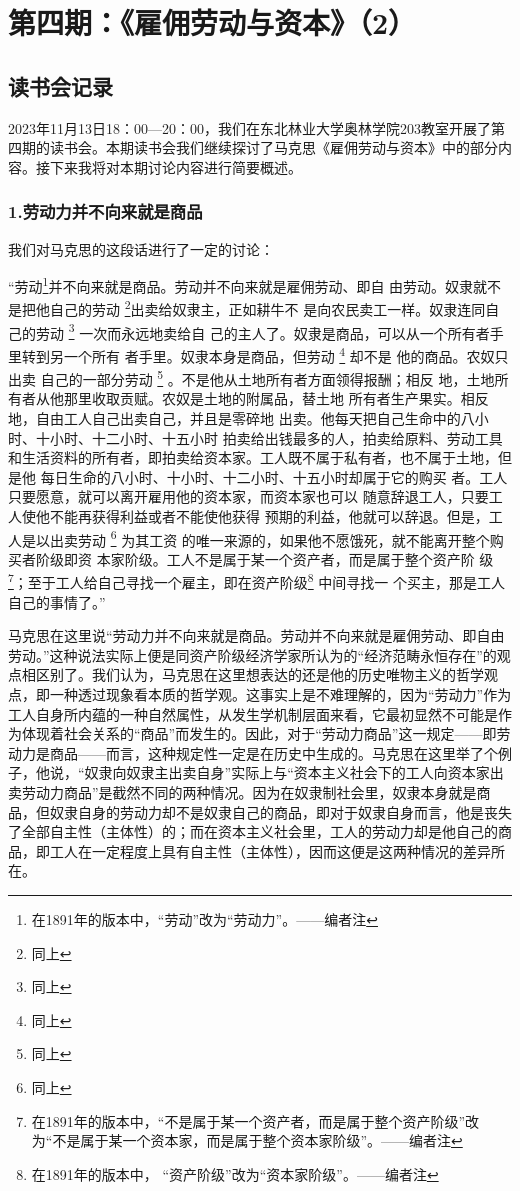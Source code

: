 \documentclass[a4paper,twoside,12pt,AutoFakeBold]{ctexart}
\begin{document}
\section{第四期：《雇佣劳动与资本》（2）}
\subsection{读书会记录}
2023年11月13日18：00—20：00，我们在东北林业大学奥林学院203教室开展了第四期的读书会。本期读书会我们继续探讨了马克思《雇佣劳动与资本》中的部分内容。接下来我将对本期讨论内容进行简要概述。

\subsubsection{1.劳动力并不向来就是商品}
我们对马克思的这段话进行了一定的讨论：
\begin{adjustwidth}{2em}{2em}
    \qquad\fangsong
    “劳动\footnote{在1891年的版本中，“劳动”改为“劳动力”。——编者注}并不向来就是商品。劳动并不向来就是雇佣劳动、即自
由劳动。奴隶就不是把他自己的劳动 \footnote{同上}出卖给奴隶主，正如耕牛不
是向农民卖工一样。奴隶连同自己的劳动 \footnote{同上} 一次而永远地卖给自
己的主人了。奴隶是商品，可以从一个所有者手里转到另一个所有
者手里。奴隶本身是商品，但劳动  \footnote{同上} 却不是 他的商品。农奴只出卖
自己的一部分劳动  \footnote{同上} 。不是他从土地所有者方面领得报酬；相反
地，土地所有者从他那里收取贡赋。农奴是土地的附属品，替土地
所有者生产果实。相反地，自由工人自己出卖自己，并且是零碎地
出卖。他每天把自己生命中的八小时、十小时、十二小时、十五小时
拍卖给出钱最多的人，拍卖给原料、劳动工具和生活资料的所有者，即拍卖给资本家。工人既不属于私有者，也不属于土地，但是他
每日生命的八小时、十小时、十二小时、十五小时却属于它的购买
者。工人只要愿意，就可以离开雇用他的资本家，而资本家也可以
随意辞退工人，只要工人使他不能再获得利益或者不能使他获得
预期的利益，他就可以辞退。但是，工人是以出卖劳动 \footnote{同上} 为其工资
的唯一来源的，如果他不愿饿死，就不能离开整个购买者阶级即资
本家阶级。工人不是属于某一个资产者，而是属于整个资产阶
级\footnote{在1891年的版本中，“不是属于某一个资产者，而是属于整个资产阶级”改为“不是属于某一个资本家，而是属于整个资本家阶级”。——编者注}；至于工人给自己寻找一个雇主，即在资产阶级\footnote{在1891年的版本中， “资产阶级”改为“资本家阶级”。——编者注} 中间寻找一
个买主，那是工人自己的事情了。”
\end{adjustwidth}

马克思在这里说“劳动力并不向来就是商品。劳动并不向来就是雇佣劳动、即自由劳动。”这种说法实际上便是同资产阶级经济学家所认为的“经济范畴永恒存在”的观点相区别了。我们认为，马克思在这里想表达的还是他的历史唯物主义的哲学观点，即一种透过现象看本质的哲学观。这事实上是不难理解的，因为“劳动力”作为工人自身所内蕴的一种自然属性，从发生学机制层面来看，它最初显然不可能是作为体现着社会关系的“商品”而发生的。因此，对于“劳动力商品”这一规定——即劳动力是商品——而言，这种规定性一定是在历史中生成的。马克思在这里举了个例子，他说，“奴隶向奴隶主出卖自身”实际上与“资本主义社会下的工人向资本家出卖劳动力商品”是截然不同的两种情况。因为在奴隶制社会里，奴隶本身就是商品，但奴隶自身的劳动力却不是奴隶自己的商品，即对于奴隶自身而言，他是丧失了全部自主性（主体性）的；而在资本主义社会里，工人的劳动力却是他自己的商品，即工人在一定程度上具有自主性（主体性），因而这便是这两种情况的差异所在。
\end{document}
